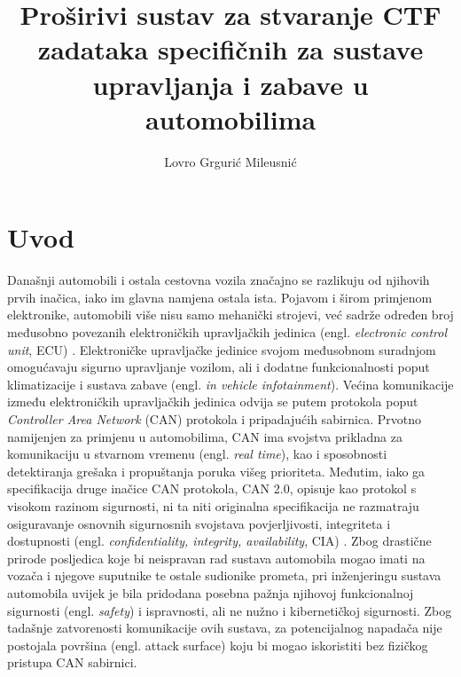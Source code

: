 \documentclass[times, utf8, diplomski, numeric]{fer}
\begin{document}

\title{Proširivi sustav za stvaranje CTF zadataka specifičnih za sustave upravljanja i
zabave u automobilima}

\author{Lovro Grgurić Mileusnić}

\maketitle

\izvornik

\zahvala{}

\tableofcontents

\chapter{Uvod}
Današnji automobili i ostala cestovna vozila značajno se razlikuju od njihovih prvih inačica, iako im glavna namjena ostala ista. Pojavom i širom primjenom elektronike, automobili više nisu samo mehanički strojevi, već sadrže određen broj međusobno povezanih elektroničkih upravljačkih jedinica (engl. \textit{electronic control unit}, ECU) \cite{koscher2010}. Elektroničke upravljačke jedinice svojom međusobnom suradnjom omogućavaju sigurno upravljanje vozilom, ali i dodatne funkcionalnosti poput klimatizacije i sustava zabave (engl. \textit{in vehicle infotainment}). Većina komunikacije između elektroničkih upravljačkih jedinica odvija se putem protokola poput \textit{Controller Area Network} (CAN) protokola i pripadajućih sabirnica. Prvotno namijenjen za primjenu u automobilima, CAN ima svojstva prikladna za komunikaciju u stvarnom vremenu (engl. \textit{real time}), kao i sposobnosti detektiranja grešaka i propuštanja poruka višeg prioriteta\cite{canopen1}. Međutim, iako ga specifikacija druge inačice CAN protokola, CAN 2.0, opisuje kao protokol s visokom razinom sigurnosti, ni ta niti originalna specifikacija ne razmatraju osiguravanje osnovnih sigurnosnih svojstava povjerljivosti, integriteta i dostupnosti (engl. \textit{confidentiality, integrity, availability}, CIA) \cite{bosch1991, canislabs1}. Zbog drastične prirode posljedica koje bi neispravan rad sustava automobila mogao imati na vozača i njegove suputnike te ostale sudionike prometa, pri inženjeringu sustava automobila uvijek je bila pridodana posebna pažnja njihovoj funkcionalnoj sigurnosti (engl. \textit{safety}) i ispravnosti, ali ne nužno i kibernetičkoj sigurnosti\cite{koscher2010}. Zbog tadašnje zatvorenosti komunikacije ovih sustava, za potencijalnog napadača nije postojala površina (engl. attack surface) koju bi mogao iskoristiti bez fizičkog pristupa CAN sabirnici.
\end{document}
